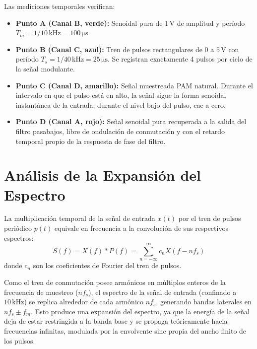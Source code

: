 Las mediciones temporales verifican:
\begin{itemize}
    \item \textbf{Punto A (Canal B, verde):} Senoidal pura de $1\,\unit{\volt}$ de amplitud y período
          $T_m = 1/10\,\unit{\kilo\hertz} = 100\,\unit{\micro\second}$.
    \item \textbf{Punto B (Canal C, azul):} Tren de pulsos rectangulares de $0$ a $5\,\unit{\volt}$ con período
          $T_s = 1/40\,\unit{\kilo\hertz} = 25\,\unit{\micro\second}$. Se registran exactamente 4 pulsos por ciclo de la
          señal modulante.
    \item \textbf{Punto C (Canal D, amarillo):} Señal muestreada PAM natural. Durante el intervalo en que el pulso está
          en alto, la señal sigue la forma senoidal instantánea de la entrada; durante el nivel bajo del pulso, cae a cero.
    \item \textbf{Punto D (Canal A, rojo):} Señal senoidal pura recuperada a la salida del filtro pasabajos, libre de
          ondulación de conmutación y con el retardo temporal propio de la respuesta de fase del filtro.
\end{itemize}

\section{Análisis de la Expansión del Espectro}
La multiplicación temporal de la señal de entrada $x(t)$ por el tren de pulsos periódico $p(t)$ equivale en frecuencia
a la convolución de sus respectivos espectros:
\begin{equation}
    S(f) = X(f) * P(f) = \sum_{n=-\infty}^\infty c_n X(f - n f_s)
    \label{eq.ej4:convolucion}
\end{equation}
donde $c_n$ son los coeficientes de Fourier del tren de pulsos.

Como el tren de conmutación posee armónicos en múltiplos enteros de la frecuencia de muestreo ($n f_s$), el espectro
de la señal de entrada (confinado a $10\,\unit{\kilo\hertz}$) se replica alrededor de cada armónico $n f_s$, generando
bandas laterales en $n f_s \pm f_m$. Esto produce una expansión del espectro, ya que la energía de la señal deja de estar
restringida a la banda base y se propaga teóricamente hacia frecuencias infinitas, modulada por la envolvente sinc
propia del ancho finito de los pulsos.

